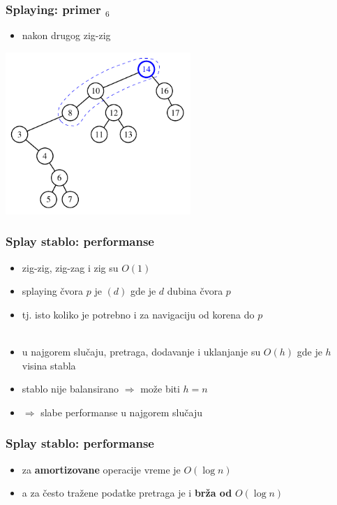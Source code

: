 \documentclass[compress]{beamer}
\begin{document}
\begin{frame}[fragile]
  \frametitle{Splaying: primer $_6$}
  \begin{itemize}
    \item nakon drugog zig-zig
  \end{itemize}
  \begin{center}
    \includegraphics[width=7cm]{asp-11-pic26.pdf}
  \end{center}
\end{frame}

\begin{frame}[fragile]
  \frametitle{Splay stablo: performanse}
  \begin{itemize}
    \item zig-zig, zig-zag i zig su $O(1)$
    \item splaying čvora $p$ je $(d)$ gde je $d$ dubina čvora $p$
    \item tj. isto koliko je potrebno i za navigaciju od korena do $p$ \\ \ \\
    \item u najgorem slučaju, pretraga, dodavanje i uklanjanje su $O(h)$ gde je $h$ visina stabla
    \item stablo nije balansirano $\Rightarrow$ može biti $h=n$
    \item $\Rightarrow$ slabe performanse u najgorem slučaju
  \end{itemize}
\end{frame}

\begin{frame}[fragile]
  \frametitle{Splay stablo: performanse}
  \begin{itemize}
    \item za \textbf{amortizovane} operacije vreme je $O(\log n)$
    \item a za često tražene podatke pretraga je i \textbf{brža od} $O(\log n)$
  \end{itemize}
\end{frame}
\end{document}
